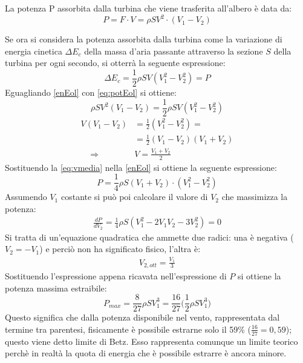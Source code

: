 La potenza P assorbita dalla turbina che viene trasferita all'albero è data da:
\begin{equation}\label{eq:potEol}
P = F \cdot V = \rho S V^2 \cdot \left( V_1 - V_2 \right)
\end{equation}

Se ora si considera la potenza assorbita dalla turbina come la variazione di energia cinetica $\Delta E_c$ della massa d'aria passante attraverso la sezione $S$ della turbina per ogni secondo, si otterrà la seguente espressione:
\begin{equation}\label{enEol}
\Delta E_c = \frac{1}{2} \rho	S V \left(V_1^2 - V_2^2 \right) = P
\end{equation}
Eguagliando \ref{enEol} con \ref{eq:potEol} si ottiene:
\begin{equation}
\rho S V^2 \left(V_1 - V_2 \right) = \frac{1}{2} \rho S V \left(V_1^2-V_2^2 \right)
\label{eq:P_a2}
\end{equation}
\begin{align}
	V \left(V_1 - V_2 \right)& = \frac{1}{2} \left(V_1^2-V_2^2 \right) = \\
	& = \frac{1}{2} \left(V_1-V_2 \right)\left(V_1+V_2 \right) \\
	\;\;\;\; \Rightarrow \;\;\;\; & V = \frac{V_1 + V_2}{2}
	\label{eq:vmedia}
\end{align}
Sostituendo la \ref{eq:vmedia} nella \ref{enEol} si ottiene la seguente espressione:
\begin{equation}\label{eq:potfin}
P = \frac{1}{4} \rho S \left( V_1 +V_2 \right) \cdot \left(V_1^2 - V_2^2 \right)
\end{equation}
Assumendo $V_1$ costante si può poi calcolare il valore di $V_2$ che massimizza la potenza:
\begin{align*}
\frac{dP}{dV_2} = \frac{1}{4} \rho S \left( V_1^2 - 2 V_1 V_2 - 3 V_2^2 \right) = 0
\end{align*}
Si tratta di un'equazione quadratica che ammette due radici: una è negativa ($V_2=-V_1 $) e perciò non ha significato fisico, l'altra è:
\begin{align*}
V_{2,ott} = \frac{V_1}{3}
\end{align*}
Sostituendo l'espressione appena ricavata nell'espressione di $P$ si ottiene la potenza massima estraibile:
\begin{equation}
\boxed{P_{max} = \frac{8}{27} \rho S V_1^3 = \frac{16}{27} \bigg(\frac{1}{2} \rho S V_1^3\bigg)}
\end{equation}
Questo significa che dalla potenza disponibile nel vento, rappresentata dal termine tra parentesi, fisicamente è possibile estrarne solo il 59\% ($\frac{16}{27}=0,59$); questo viene detto limite di Betz. Esso rappresenta comunque un limite teorico perchè in realtà la quota di energia che è possibile estrarre è ancora minore.


